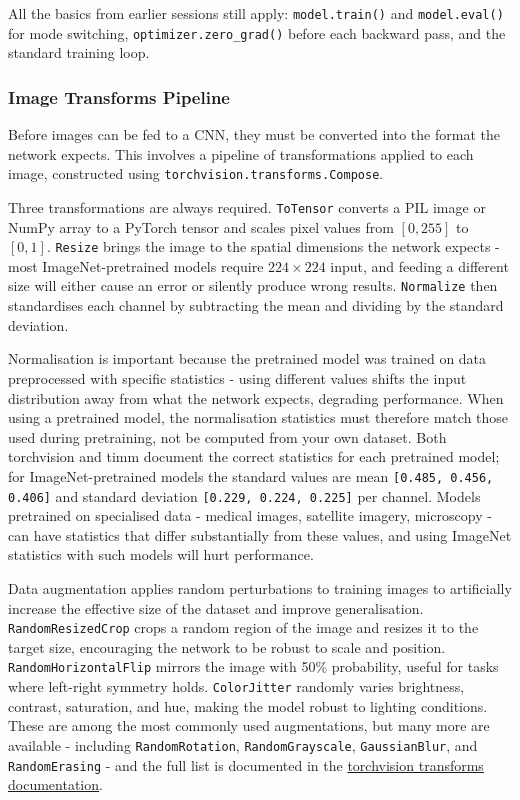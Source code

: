 All the basics from earlier sessions still apply: \texttt{model.train()} and \texttt{model.eval()} for mode switching, \texttt{optimizer.zero\_grad()} before each backward pass, and the standard training loop.

\subsubsection{Image Transforms Pipeline}

Before images can be fed to a CNN, they must be converted into the format the network expects. This involves a pipeline of transformations applied to each image, constructed using \texttt{torchvision.transforms.Compose}.

Three transformations are always required. \texttt{ToTensor} converts a PIL image or NumPy array to a PyTorch tensor and scales pixel values from $[0, 255]$ to $[0, 1]$. \texttt{Resize} brings the image to the spatial dimensions the network expects - most ImageNet-pretrained models require $224 \times 224$ input, and feeding a different size will either cause an error or silently produce wrong results. \texttt{Normalize} then standardises each channel by subtracting the mean and dividing by the standard deviation.

Normalisation is important because the pretrained model was trained on data preprocessed with specific statistics - using different values shifts the input distribution away from what the network expects, degrading performance. When using a pretrained model, the normalisation statistics must therefore match those used during pretraining, not be computed from your own dataset. Both torchvision and timm document the correct statistics for each pretrained model; for ImageNet-pretrained models the standard values are mean \texttt{[0.485, 0.456, 0.406]} and standard deviation \texttt{[0.229, 0.224, 0.225]} per channel. Models pretrained on specialised data - medical images, satellite imagery, microscopy - can have statistics that differ substantially from these values, and using ImageNet statistics with such models will hurt performance.

Data augmentation applies random perturbations to training images to artificially increase the effective size of the dataset and improve generalisation. \texttt{RandomResizedCrop} crops a random region of the image and resizes it to the target size, encouraging the network to be robust to scale and position. \texttt{RandomHorizontalFlip} mirrors the image with 50\% probability, useful for tasks where left-right symmetry holds. \texttt{ColorJitter} randomly varies brightness, contrast, saturation, and hue, making the model robust to lighting conditions. These are among the most commonly used augmentations, but many more are available - including \texttt{RandomRotation}, \texttt{RandomGrayscale}, \texttt{GaussianBlur}, and \texttt{RandomErasing} - and the full list is documented in the \href{https://pytorch.org/vision/stable/transforms.html}{torchvision transforms documentation}. 

